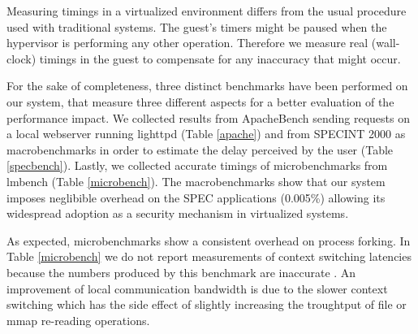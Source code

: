 Measuring timings in a virtualized environment differs from the usual procedure used with traditional systems. The guest's timers might be paused when the hypervisor is performing any other operation. Therefore we measure real (wall-clock) timings in the guest to compensate for any inaccuracy that might occur.

For the sake of completeness, three distinct benchmarks have been performed on our system, that measure three different aspects for a better evaluation of the performance impact.
We collected results from ApacheBench \cite{apachebench} sending requests on a local webserver running lighttpd (Table \ref{apache}) and from SPECINT 2000 as macrobenchmarks in order to estimate the delay perceived by the user (Table \ref{specbench}). Lastly, we collected accurate timings of microbenchmarks from lmbench (Table \ref{microbench}). The macrobenchmarks show that our system imposes neglibible overhead on the SPEC applications (0.005\%) allowing its widespread adoption as a security mechanism in virtualized systems. 

As expected, microbenchmarks show a consistent overhead on process forking. In Table \ref{microbench} we do not report measurements of context switching latencies because the numbers produced by this benchmark are inaccurate \cite{lmbenchbug,lmbenchevil}. An improvement of local communication bandwidth is due to the slower context switching which has the side effect of slightly increasing the troughtput of file or mmap re-reading operations.  

